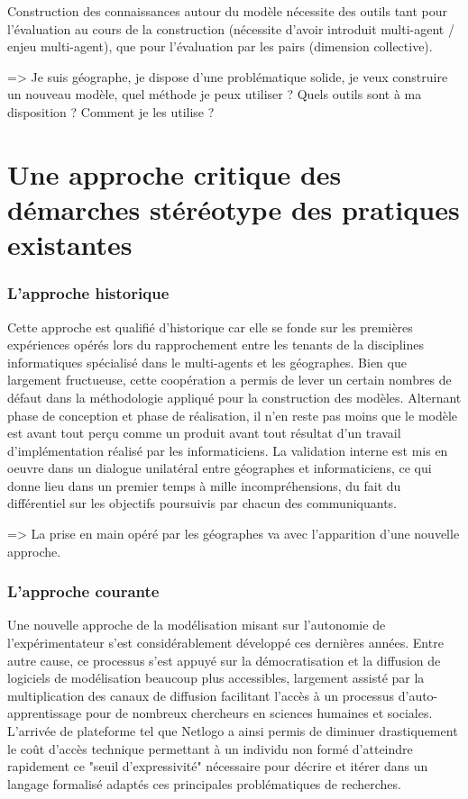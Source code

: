 Construction des connaissances autour du modèle nécessite des outils tant pour l'évaluation au cours de la construction (nécessite d'avoir introduit multi-agent / enjeu multi-agent), que pour l'évaluation par les pairs (dimension collective). 


=> Je suis géographe, je dispose d'une problématique solide, je veux construire un nouveau modèle, quel méthode je peux utiliser ? Quels outils sont à ma disposition ? Comment je les utilise ?

\section{Une approche critique des démarches stéréotype des pratiques existantes}

\subsubsection{L'approche historique}

Cette approche est qualifié d'historique car elle se fonde sur les premières expériences opérés lors du rapprochement entre les tenants de la disciplines informatiques spécialisé dans le multi-agents et les géographes.
Bien que largement fructueuse, cette coopération a permis de lever un certain nombres de défaut dans la méthodologie appliqué pour la construction des modèles. Alternant phase de conception et phase de réalisation, il n'en reste pas moins que le modèle est avant tout perçu comme un produit avant tout résultat d'un travail d'implémentation réalisé par les informaticiens. La validation interne est mis en oeuvre dans un dialogue unilatéral entre géographes et informaticiens, ce qui donne lieu dans un premier temps à mille incompréhensions, du fait du différentiel sur les objectifs poursuivis par chacun des communiquants.

=> La prise en main opéré par les géographes va avec l'apparition d'une nouvelle approche.

\subsubsection{L'approche courante}

Une nouvelle approche de la modélisation misant sur l'autonomie de l'expérimentateur s'est considérablement développé ces dernières années. Entre autre cause, ce processus s'est appuyé sur la démocratisation et la diffusion de logiciels de modélisation beaucoup plus accessibles, largement assisté par la multiplication des canaux de diffusion facilitant l'accès à un processus  d'auto-apprentissage pour de nombreux chercheurs en sciences humaines et sociales. L'arrivée de plateforme tel que Netlogo a ainsi permis de diminuer drastiquement le coût d'accès technique permettant à un individu non formé d'atteindre rapidement ce "seuil d'expressivité" nécessaire pour décrire et itérer dans un langage formalisé adaptés ces principales problématiques de recherches.

